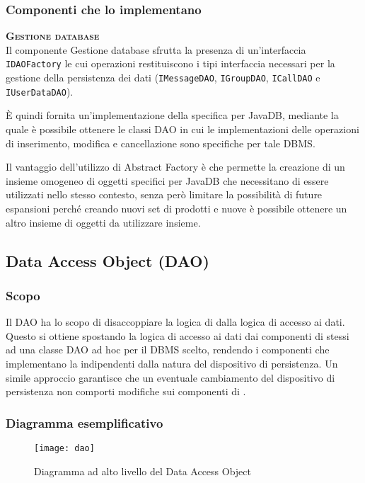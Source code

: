 \subsubsection{Componenti che lo implementano}
\begin{description}
  \item{\bfseries\scshape Gestione database}\\
Il componente Gestione database sfrutta la presenza di un'interfaccia \texttt{IDAOFactory} le cui operazioni restituiscono i tipi interfaccia necessari per la gestione della persistenza dei dati (\texttt{IMessageDAO}, \texttt{IGroupDAO}, \texttt{ICallDAO} e \texttt{IUserDataDAO}).

È quindi fornita un'implementazione della  specifica per JavaDB, mediante la quale è possibile ottenere le classi DAO in cui le implementazioni delle operazioni di inserimento, modifica e cancellazione sono specifiche per tale DBMS\@.

Il vantaggio dell'utilizzo di Abstract Factory è che permette la creazione di un insieme omogeneo di oggetti specifici per JavaDB che necessitano di essere utilizzati nello stesso contesto, senza però limitare la possibilità di future espansioni perché creando nuovi set di prodotti e nuove  è possibile ottenere un altro insieme di oggetti da utilizzare insieme.
\end{description}

\subsection{Data Access Object (DAO)}

\subsubsection{Scopo}
Il  DAO ha lo scopo di disaccoppiare la logica di  dalla logica di accesso ai dati. Questo si ottiene spostando la logica di accesso ai dati dai componenti di  stessi ad una classe DAO ad hoc per il DBMS scelto, rendendo i componenti che implementano la  indipendenti dalla natura del dispositivo di persistenza. Un simile approccio garantisce che un eventuale cambiamento del dispositivo di persistenza non comporti modifiche sui componenti di .

\subsubsection{Diagramma esemplificativo}
  \begin{figure}[H]
  \centering
  \texttt{[image: dao]}
  \caption{Diagramma ad alto livello del  Data Access Object}\label{fig:dao}
\end{figure}

